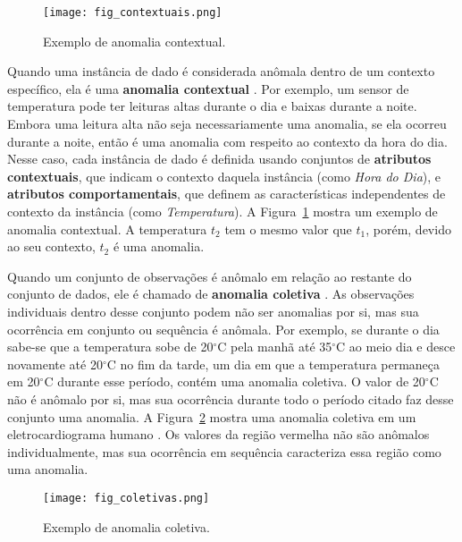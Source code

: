 \documentclass[cic,tc]{iiufrgs}
\begin{document}
\bigskip
\begin{figure}
	\caption{Exemplo de anomalia contextual.}
	\bigskip
		\begin{center}
			\texttt{[image: fig\_contextuais.png]}
		\end{center}
	\label{contextuais}
\end{figure}

Quando uma instância de dado é considerada anômala dentro de um contexto específico, ela é uma \textbf{anomalia contextual} \cite{AnomalyDetectionSurvey2009}. Por exemplo, um sensor de temperatura pode ter leituras altas durante o dia e baixas durante a noite. Embora uma leitura alta não seja necessariamente uma anomalia, se ela ocorreu durante a noite, então é uma anomalia com respeito ao contexto da hora do dia. Nesse caso, cada instância de dado é definida usando conjuntos de \textbf{atributos contextuais}, que indicam o contexto daquela instância (como \textit{Hora do Dia}), e \textbf{atributos comportamentais}, que definem as características independentes de contexto da instância (como \textit{Temperatura}). A Figura~\ref{contextuais} mostra um exemplo de anomalia contextual. A temperatura $t_2$ tem o mesmo valor que $t_1$, porém, devido ao seu contexto, $t_2$ é uma anomalia.

Quando um conjunto de observações é anômalo em relação ao restante do conjunto de dados, ele é chamado de \textbf{anomalia coletiva} \cite{AnomalyDetectionSurvey2009}. As observações individuais dentro desse conjunto podem não ser anomalias por si, mas sua ocorrência em conjunto ou sequência é anômala. Por exemplo, se durante o dia sabe-se que a temperatura sobe de 20$^{\circ}$C pela manhã até 35$^{\circ}$C ao meio dia e desce novamente até 20$^{\circ}$C no fim da tarde, um dia em que a temperatura permaneça em 20$^{\circ}$C durante esse período, contém uma anomalia coletiva. O valor de 20$^{\circ}$C não é anômalo por si, mas sua ocorrência durante todo o período citado faz desse conjunto uma anomalia. A Figura~\ref{coletivas} mostra uma anomalia coletiva em um eletrocardiograma humano \cite{Goldberger}. Os valores da região vermelha não são anômalos individualmente, mas sua ocorrência em sequência caracteriza essa região como uma anomalia.


\begin{figure}
	\caption{Exemplo de anomalia coletiva.}
		\begin{center}
			\texttt{[image: fig\_coletivas.png]}
		\end{center}
	\label{coletivas}
\end{figure}
\end{document}
